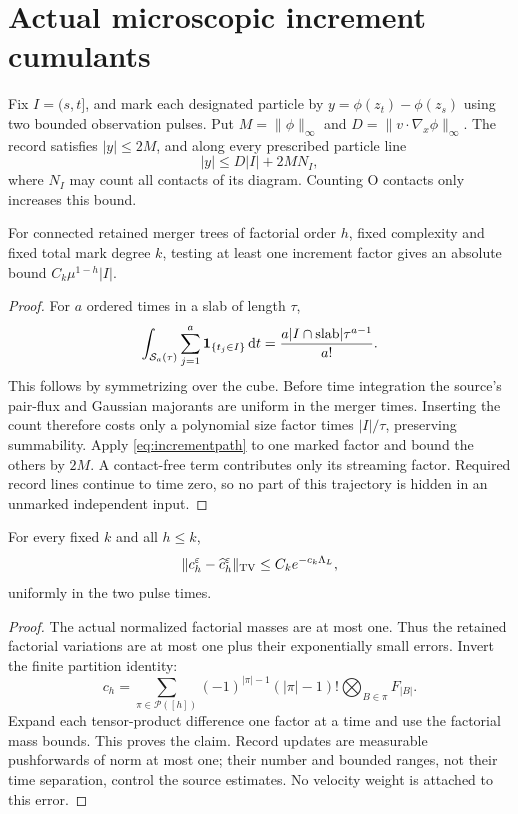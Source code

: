 \section{Actual microscopic increment cumulants}\label{sec:increments}
Fix $I=(s,t]$, and mark each designated particle by
$y=\phi(z_t)-\phi(z_s)$ using two bounded observation pulses.
Put $M=\|\phi\|_\infty$ and $D=\|v\cdot\nabla_x\phi\|_\infty$.
The record satisfies $|y|\leq2M$, and along every prescribed particle line
\begin{equation}\label{eq:incrementpath}
 |y|\leq D|I|+2M N_I,
\end{equation}
where $N_I$ may count all contacts of its diagram. Counting O contacts
only increases this bound.

\begin{lemma}\label{lem:treewindow}
For connected retained merger trees of factorial order $h$, fixed
complexity and fixed total mark degree $k$, testing at least one increment
factor gives an absolute bound $C_k\mu^{1-h}|I|$.
\end{lemma}
\begin{proof}
For $a$ ordered times in a slab of length $\tau$,
\[
 \int_{\mathcal S_a(\tau)}
      \sum_{j=1}^a\mathbf1_{\{t_j\in I\}}\,\mathrm d t
       =\frac{a|I\cap\text{slab}|\tau^{a-1}}{a!}.
\]
This follows by symmetrizing over the cube. Before time integration the
source's pair-flux and Gaussian majorants are uniform in the merger
times. Inserting the count therefore costs only a polynomial size factor
times $|I|/\tau$, preserving summability.
Apply \eqref{eq:incrementpath} to one marked factor and bound the others
by $2M$. A contact-free term contributes only its streaming factor.
Required record lines continue to time zero, so no part of this trajectory
is hidden in an unmarked independent input.
\end{proof}

\begin{lemma}\label{lem:remainder}
For every fixed $k$ and all $h\leq k$,
\[
 \|c_h^\varepsilon-\widehat c_h^\varepsilon\|_{\mathrm{TV}}
       \leq C_k e^{-c_k\Lambda_L},
\]
uniformly in the two pulse times.
\end{lemma}
\begin{proof}
The actual normalized factorial masses are at most one.
Thus the retained factorial variations are at most one plus their
exponentially small errors. Invert the finite partition identity:
\[
 c_h=\sum_{\pi\in\mathcal P([h])}
       (-1)^{|\pi|-1}(|\pi|-1)!
       \bigotimes_{B\in\pi}F_{|B|}.
\]
Expand each tensor-product difference one factor at a time and use the
factorial mass bounds. This proves the claim.
Record updates are measurable pushforwards of norm at most one; their
number and bounded ranges, not their time separation, control the source
estimates. No velocity weight is attached to this error.
\end{proof}

